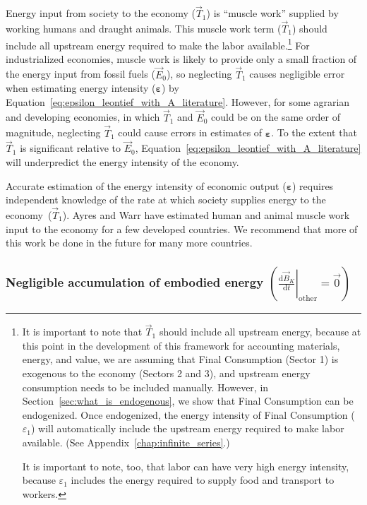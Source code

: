 Energy input from society to the economy ($\vec{T}_{1}$)
is ``muscle work'' supplied by working humans 
and draught animals.\cite{Ayres:2003ec,Ayres:2010ug,Warr:2012cg} 
This muscle work term ($\vec{T}_{1}$) should include
all upstream energy required to make the labor available.\footnote{It is important
to note that $\vec{T}_{1}$ should include all upstream energy,
because at this point in the development of this framework 
for accounting materials, energy, and value,
we are assuming that Final Consumption (Sector 1) is exogenous to the economy 
(Sectors 2 and 3), 
and upstream energy consumption needs to be included manually.
However, in Section~\ref{sec:what_is_endogenous}, we show that Final Consumption
can be endogenized.
Once endogenized, the energy intensity of Final Consumption ($\varepsilon_{1}$) 
will automatically include the upstream energy required to make labor available.
(See Appendix~\ref{chap:infinite_series}.)

It is important to note, too, that labor can have very high energy intensity, 
because $\varepsilon_{1}$ includes the energy required to supply food and transport
to workers.} 
For industrialized economies, muscle work 
is likely to provide only a small fraction
of the energy input from fossil fuels ($\vec{E}_{0}$),
so neglecting $\vec{T}_{1}$ causes negligible error when
estimating energy intensity ($\bm{\varepsilon}$) by
Equation~\ref{eq:epsilon_leontief_with_A_literature}.
However, for some agrarian 
and developing economies, 
in which $\vec{T}_{1}$ and $\vec{E}_{0}$ 
could be on the same order of magnitude,
neglecting $\vec{T}_{1}$ could cause errors
in estimates of $\bm{\varepsilon}$.
To the extent that $\vec{T}_{1}$ 
is significant relative to $\vec{E}_{0}$,
Equation~\ref{eq:epsilon_leontief_with_A_literature}
will underpredict the energy intensity of the economy.

Accurate estimation of the energy intensity of economic output ($\bm{\varepsilon}$)
requires independent knowledge of the rate at which society supplies
energy to the economy~($\vec{T}_{1}$). 
Ayres and Warr have estimated human and animal muscle work
input to the economy for a few developed countries.\cite{Ayres:2010ug}
We recommend that more of this work be done 
in the future for many more countries.


\subsubsection{Negligible accumulation of embodied energy
$\left( \left. \frac{\mathrm{d}\vec{B}_{K}}{\mathrm{d}t} \right|_{\mathrm{other}} = \vec{0} \right)$}

